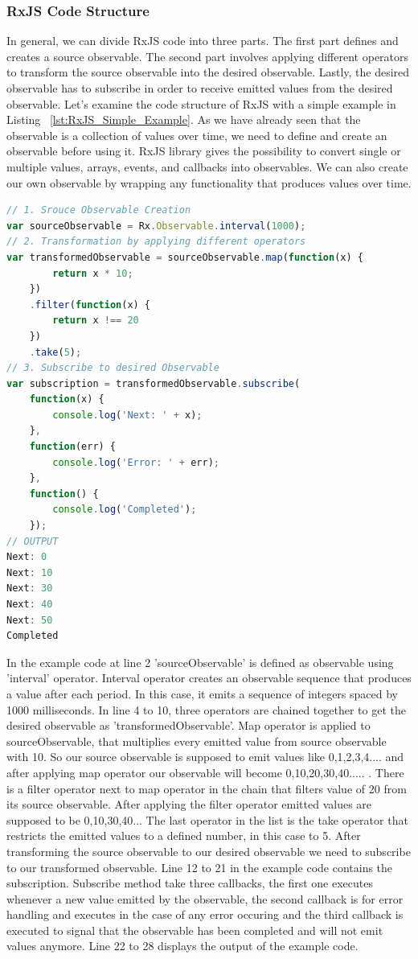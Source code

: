 \subsubsection{RxJS Code Structure}
In general, we can divide RxJS code into three parts. The first part defines and creates a source observable. The second part involves applying different operators to transform the source observable into the desired observable. Lastly, the desired observable has to subscribe in order to receive emitted values from the desired observable. Let's examine the code structure of RxJS with a simple example in Listing ~\ref{lst:RxJS_Simple_Example}. As we have already seen that the observable is a collection of values over time, we need to define and create an observable before using it. RxJS library gives the possibility to convert single or multiple values, arrays, events, and callbacks into observables. We can also create our own observable by wrapping any functionality that produces values over time.
\begin{lstlisting}[language=JavaScript, caption=RxJS Simple Example, label={lst:RxJS_Simple_Example}]
// 1. Srouce Observable Creation
var sourceObservable = Rx.Observable.interval(1000);
// 2. Transformation by applying different operators
var transformedObservable = sourceObservable.map(function(x) {
		return x * 10;
	})
	.filter(function(x) {
		return x !== 20
	})
	.take(5);
// 3. Subscribe to desired Observable 
var subscription = transformedObservable.subscribe(
	function(x) {
		console.log('Next: ' + x);
	},
	function(err) {
		console.log('Error: ' + err);
	},
	function() {
		console.log('Completed');
	});
// OUTPUT
Next: 0
Next: 10
Next: 30
Next: 40
Next: 50
Completed
\end{lstlisting}
In the example code at line 2 'sourceObservable' is defined as observable using 'interval' operator. Interval operator creates an observable sequence that produces a value after each period. In this case, it emits a sequence of integers spaced by 1000 milliseconds. In line 4 to 10, three operators are chained together to get the desired observable as 'transformedObservable'. Map operator is applied to sourceObservable, that multiplies every emitted value from source observable with 10. So our source observable is supposed to emit values like 0,1,2,3,4.... and after applying map operator our observable will become 0,10,20,30,40..... . There is a filter operator next to map operator in the chain that filters value of 20 from its source observable. After applying the filter operator emitted values are supposed to be 0,10,30,40... The last operator in the list is the take operator that restricts the emitted values to a defined number, in this case to 5.
After transforming the source observable to our desired observable we need to subscribe to our transformed observable. Line 12 to 21 in the example code contains the subscription. Subscribe method take three callbacks, the first one executes whenever a new value emitted by the observable, the second callback is for error handling and executes in the case of any error occuring and the third callback is executed to signal that the observable has been completed and will not emit values anymore. Line 22 to 28 displays the output of the example code.


